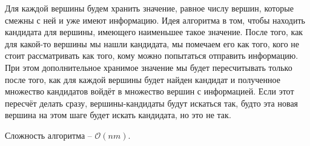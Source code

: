 Для каждой вершины будем хранить значение, равное числу вершин, которые смежны с ней и уже имеют информацию. Идея алгоритма в том, чтобы находить кандидата для вершины, имеющего наименьшее такое значение. После того, как для какой-то вершины мы нашли кандидата, мы помечаем его как того, кого не стоит рассматривать как того, кому можно попытаться отправить информацию. При этом дополнительное хранимое значение мы будет пересчитывать только после того, как для каждой вершины будет найден кандидат и полученное множество кандидатов войдёт в множество вершин с информацией. Если этот пересчёт делать сразу, вершины-кандидаты будут искаться так, будто эта новая вершина на этом шаге будет искать кандидата, но это не так.

Сложность алгоритма -- $\mathcal{O}(nm)$.
